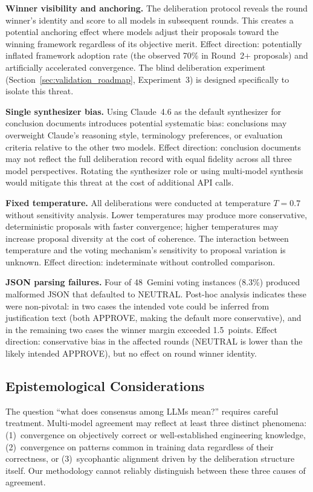 \documentclass[11pt,a4paper]{article}
\begin{document}
\textbf{Winner visibility and anchoring.} The deliberation protocol reveals the round winner's identity and score to all models in subsequent rounds. This creates a potential anchoring effect where models adjust their proposals toward the winning framework regardless of its objective merit. Effect direction: potentially inflated framework adoption rate (the observed 70\% in Round~2+ proposals) and artificially accelerated convergence. The blind deliberation experiment (Section~\ref{sec:validation_roadmap}, Experiment~3) is designed specifically to isolate this threat.

\textbf{Single synthesizer bias.} Using Claude~4.6 as the default synthesizer for conclusion documents introduces potential systematic bias: conclusions may overweight Claude's reasoning style, terminology preferences, or evaluation criteria relative to the other two models. Effect direction: conclusion documents may not reflect the full deliberation record with equal fidelity across all three model perspectives. Rotating the synthesizer role or using multi-model synthesis would mitigate this threat at the cost of additional API calls.

\textbf{Fixed temperature.} All deliberations were conducted at temperature $T = 0.7$ without sensitivity analysis. Lower temperatures may produce more conservative, deterministic proposals with faster convergence; higher temperatures may increase proposal diversity at the cost of coherence. The interaction between temperature and the voting mechanism's sensitivity to proposal variation is unknown. Effect direction: indeterminate without controlled comparison.

\textbf{JSON parsing failures.} Four of 48~Gemini voting instances (8.3\%) produced malformed JSON that defaulted to NEUTRAL. Post-hoc analysis indicates these were non-pivotal: in two cases the intended vote could be inferred from justification text (both APPROVE, making the default more conservative), and in the remaining two cases the winner margin exceeded 1.5~points. Effect direction: conservative bias in the affected rounds (NEUTRAL is lower than the likely intended APPROVE), but no effect on round winner identity.

\subsection{Epistemological Considerations}

The question ``what does consensus among LLMs mean?'' requires careful treatment. Multi-model agreement may reflect at least three distinct phenomena: (1)~convergence on objectively correct or well-established engineering knowledge, (2)~convergence on patterns common in training data regardless of their correctness, or (3)~sycophantic alignment driven by the deliberation structure itself. Our methodology cannot reliably distinguish between these three causes of agreement.
\end{document}
